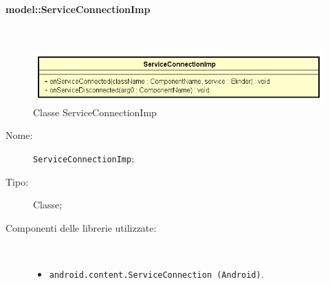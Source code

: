 \documentclass[../DefinizioneDiProdotto.tex]{subfiles}
\begin{document}
\paragraph{model::ServiceConnectionImp}
\
\begin{figure}[H]
	\centering
	\includegraphics[width=\maxwidth]{img/ServiceConnectionImp.png}
	\caption{Classe ServiceConnectionImp}\label{fig:model::ServiceConnectionImp} 
\end{figure}
\begin{description}
	\item[Nome:] \texttt{ServiceConnectionImp};
	\item[Tipo:] Classe;
	\item[Componenti delle librerie utilizzate:] \
	\begin{itemize}
		\item \texttt{android.content.ServiceConnection (Android)}.
		

\end{itemize}
\end{description}
\end{document}
